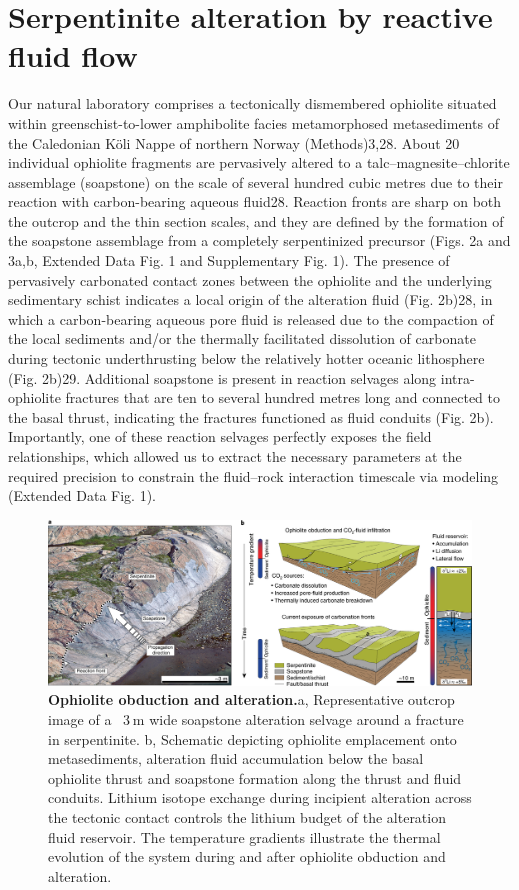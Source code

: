 \section*{Serpentinite alteration by reactive fluid flow}

Our natural laboratory comprises a tectonically dismembered ophiolite situated within greenschist-to-lower amphibolite facies metamorphosed metasediments of the Caledonian Köli Nappe of northern Norway (Methods)3,28. About 20 individual ophiolite fragments are pervasively altered to a talc–magnesite–chlorite assemblage (soapstone) on the scale of several hundred cubic metres due to their reaction with carbon-bearing aqueous fluid28. Reaction fronts are sharp on both the outcrop and the thin section scales, and they are defined by the formation of the soapstone assemblage from a completely serpentinized precursor (Figs. 2a and 3a,b, Extended Data Fig. 1 and Supplementary Fig. 1). The presence of pervasively carbonated contact zones between the ophiolite and the underlying sedimentary schist indicates a local origin of the alteration fluid (Fig. 2b)28, in which a carbon-bearing aqueous pore fluid is released due to the compaction of the local sediments and/or the thermally facilitated dissolution of carbonate during tectonic underthrusting below the relatively hotter oceanic lithosphere (Fig. 2b)29. Additional soapstone is present in reaction selvages along intra-ophiolite fractures that are ten to several hundred metres long and connected to the basal thrust, indicating the fractures functioned as fluid conduits (Fig. 2b). Importantly, one of these reaction selvages perfectly exposes the field relationships, which allowed us to extract the necessary parameters at the required precision to constrain the fluid–rock interaction timescale via modeling (Extended Data Fig. 1).

\begin{figure}[ht]
	\centering
	\includegraphics[width=0.5\linewidth]{figures/fig2.png}
	\caption{\textbf{Ophiolite obduction and alteration.}a, Representative outcrop image of a ~3 m wide soapstone alteration selvage around a fracture in serpentinite. b, Schematic depicting ophiolite emplacement onto metasediments, alteration fluid accumulation below the basal ophiolite thrust and soapstone formation along the thrust and fluid conduits. Lithium isotope exchange during incipient alteration across the tectonic contact controls the lithium budget of the alteration fluid reservoir. The temperature gradients illustrate the thermal evolution of the system during and after ophiolite obduction and alteration.}
	\label{fig:my_label}
\end{figure}

